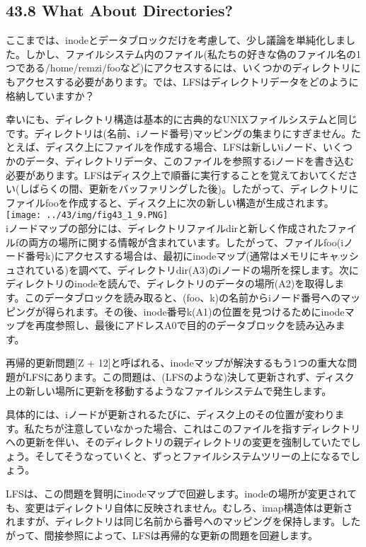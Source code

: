 \hypertarget{what-about-directories}{%
\subsection*{43.8 What About Directories?}\label{what-about-directories}}

ここまでは、inodeとデータブロックだけを考慮して、少し議論を単純化しました。しかし、ファイルシステム内のファイル(私たちの好きな偽のファイル名の1つである/home/remzi/fooなど)にアクセスするには、いくつかのディレクトリにもアクセスする必要があります。では、LFSはディレクトリデータをどのように格納していますか？

幸いにも、ディレクトリ構造は基本的に古典的なUNIXファイルシステムと同じです。ディレクトリは(名前、iノード番号)マッピングの集まりにすぎません。たとえば、ディスク上にファイルを作成する場合、LFSは新しいiノード、いくつかのデータ、ディレクトリデータ、このファイルを参照するiノードを書き込む必要があります。LFSはディスク上で順番に実行することを覚えておいてください(しばらくの間、更新をバッファリングした後)。したがって、ディレクトリにファイルfooを作成すると、ディスク上に次の新しい構造が生成されます。\\
\texttt{[image: ../43/img/fig43\_1\_9.PNG]}\\
iノードマップの部分には、ディレクトリファイルdirと新しく作成されたファイルfの両方の場所に関する情報が含まれています。したがって、ファイルfoo(iノード番号k)にアクセスする場合は、最初にinodeマップ(通常はメモリにキャッシュされている)を調べて、ディレクトリdir(A3)のiノードの場所を探します。次にディレクトリのinodeを読んで、ディレクトリのデータの場所(A2)を取得します。このデータブロックを読み取ると、(foo、k)の名前からiノード番号へのマッピングが得られます。その後、inode番号k(A1)の位置を見つけるためにinodeマップを再度参照し、最後にアドレスA0で目的のデータブロックを読み込みます。

再帰的更新問題{[}Z +
12{]}と呼ばれる、inodeマップが解決するもう1つの重大な問題がLFSにあります。この問題は、(LFSのような)決して更新されず、ディスク上の新しい場所に更新を移動するようなファイルシステムで発生します。

具体的には、iノードが更新されるたびに、ディスク上のその位置が変わります。私たちが注意していなかった場合、これはこのファイルを指すディレクトリへの更新を伴い、そのディレクトリの親ディレクトリの変更を強制していたでしょう。そしてそうなっていくと、ずっとファイルシステムツリーの上になるでしょう。

LFSは、この問題を賢明にinodeマップで回避します。inodeの場所が変更されても、変更はディレクトリ自体に反映されません。むしろ、imap構造体は更新されますが、ディレクトリは同じ名前から番号へのマッピングを保持します。したがって、間接参照によって、LFSは再帰的な更新の問題を回避します。

